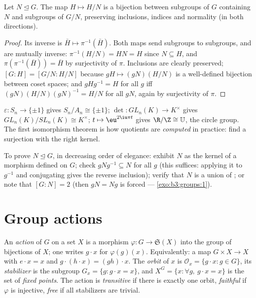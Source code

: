 \begin{theorem}\label{thm:b3:groups:correspondence}
Let $N \trianglelefteq G$. The map $H \mapsto H/N$ is a bijection
between subgroups of $G$ containing $N$ and subgroups of $G/N$,
preserving inclusions, indices and normality (in both directions).
\end{theorem}

\begin{proof}
Its inverse is $\bar H \mapsto \pi^{-1}(\bar H)$. Both maps send
subgroups to subgroups, and are mutually inverse: $\pi^{-1}(H/N) =
HN = H$ since $N \subseteq H$, and $\pi(\pi^{-1}(\bar H)) = \bar H$
by surjectivity of $\pi$. Inclusions are clearly preserved;
$[G:H] = [G/N : H/N]$ because $gH \mapsto (gN)(H/N)$ is a
well-defined bijection between coset spaces; and $gHg^{-1} = H$ for
all $g$ iff $(gN)(H/N)(gN)^{-1} = H/N$ for all $gN$, again by
surjectivity of $\pi$.
\end{proof}

\begin{example}\label{ex:b3:groups:firstiso}
$\varepsilon \colon S_n \to \{\pm 1\}$ gives $S_n/A_n \cong
\{\pm1\}$; $\det \colon GL_n(K) \to K^\times$ gives
$GL_n(K)/SL_n(K) \cong K^\times$; $t \mapsto \eu^{2\iu\pi t}$ gives
$\R/\Z \cong \mathbb U$, the circle group. The first isomorphism
theorem is how quotients are \emph{computed} in practice: find a
surjection with the right kernel.
\end{example}

\begin{method}\label{met:b3:groups:normal}
To prove $N \trianglelefteq G$, in decreasing order of elegance:
exhibit $N$ as the kernel of a morphism defined on $G$; check
$gNg^{-1} \subseteq N$ for all $g$ (this suffices: applying it to
$g^{-1}$ and conjugating gives the reverse inclusion); verify that
$N$ is a union of ; or note that $[G:N] = 2$
(then $gN = Ng$ is forced --- \cref{exo:b3:groups:1}).
\end{method}

\section{Group actions}

\begin{definition}\label{def:b3:groups:action}
An \emph{action} of $G$ on a set $X$ is a
morphism $\varphi \colon G \to \mathfrak{S}(X)$ into the group of
bijections of $X$; one writes $g \cdot x$ for $\varphi(g)(x)$.
Equivalently: a map $G \times X \to X$ with $e \cdot x = x$ and $g
\cdot (h \cdot x) = (gh) \cdot x$. The \emph{orbit} of
$x$ is $\mathcal O_x = \{g \cdot x : g \in G\}$, its
\emph{stabilizer} is the subgroup $G_x = \{g :
g\cdot x = x\}$, and $X^G = \{x : \forall g,\ g \cdot x = x\}$ is
the set of \emph{fixed points}. The action is \emph{transitive} if
there is exactly one orbit, \emph{faithful} if $\varphi$ is
injective, \emph{free} if all stabilizers are trivial.
\end{definition}

